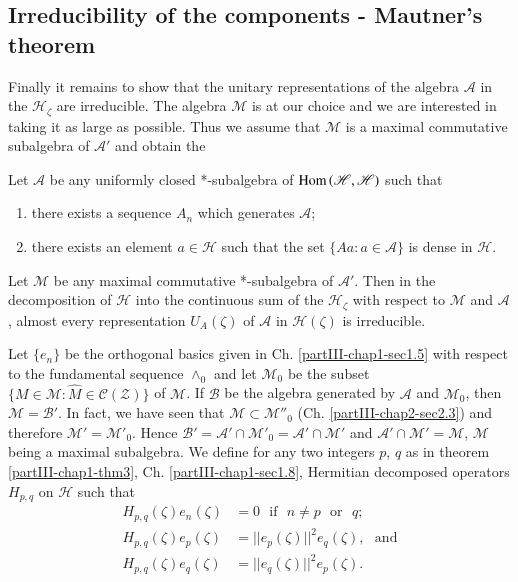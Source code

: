 \subsection{Irreducibility of the components - Mautner's
  theorem}\label{partIII-chap2-sec2.4}%

Finally it remains to show that the unitary representations of the
algebra $\mathcal{A}$ in the $\mathscr{H}_\zeta$ are irreducible. The
algebra $\mathscr{M}$ is at our choice and we are interested in taking it as
large as possible. Thus we assume that $\mathscr{M}$ is a maximal commutative
subalgebra of $\mathcal{A'}$ and obtain the  

\setcounter{thm}{0}
\begin{thm}[Mautner]\label{partIII-chap2-thm1}
{Let} $\mathcal{A}$ be any uniformly closed *-subalgebra of $\operatorname{Hom}
\mathscr{(H, H)}$  such that 
\begin{enumerate}
\renewcommand{\theenumi}{\alph{enumi}}
\renewcommand{\labelenumi}{\rm(\theenumi)} 
\item there exists a sequence $A_n$ which generates
  $\mathcal{A}$; 

\item there exists an element $a \in \mathscr{H}$ such that the
  set $\{ Aa : a \in \mathcal{A}\}$ is dense in $\mathscr{H}$. 
\end{enumerate}

{Let} $\mathscr{M}$ {be any maximal commutative} *-{subalgebra of}
$\mathcal{A}'$. {Then in the decomposition of} $\mathscr{H}$ {into
  the continuous sum of the} $\mathscr{H}_{\zeta}$ {with respect
  to } $\mathscr{M}$\pageoriginale 
{and} $\mathcal{A}$, {almost every representation}
$U_A (\zeta)$ {of} $\mathcal{A}$ in $\mathscr{H}(\zeta)$ {is irreducible}. 
\end{thm}

Let $\{e_n\}$ be the orthogonal basics given in
Ch. \ref{partIII-chap1-sec1.5} with respect 
to the fundamental sequence $\wedge_0$ and let $\mathscr{M}_0$ be the subset
$\{M \in \mathscr{M}:\hat{M}\in \mathscr{C} (\mathcal{Z})\}$ of
$\mathscr{M}$. If 
$\mathscr{B}$ be the algebra generated by $\mathcal{A}$ and $\mathscr{M}_0$,
then $\mathscr{M}=\mathscr{B}'$. In fact, we have seen that
$\mathscr{M} \subset \mathscr{M}''_0$ (Ch. \ref{partIII-chap2-sec2.3})
and therefore 
$\mathscr{M}'=\mathscr{M}'_0$. Hence $\mathscr{B}'=\mathcal{A'} 
\cap \mathscr{M}'_0 =\mathcal{A}'\cap \mathscr{M}'$ and $\mathcal{A}'
\cap \mathscr{M}'=\mathscr{M}$, $\mathscr{M}$ being a
maximal subalgebra. We define for any two integers $p$, $q$ as in theorem
\ref{partIII-chap1-thm3}, Ch. \ref{partIII-chap1-sec1.8}, Hermitian
decomposed operators $H_{p,q}$ on 
$\mathscr{H}$ such that 
\begin{align*}
H_{p,q}(\zeta) e_n (\zeta) & = 0 \text{~ if~ } n \neq p \text{~ or~ } q;\\
H_{p,q}(\zeta) e_p(\zeta) & = || e_p (\zeta ) ||^2 e_q (\zeta),
\text{~ and}\\  
H_{p,q}(\zeta) e_q (\zeta) & = || e_q (\zeta ) ||^2 e_p (\zeta ).
\end{align*}

